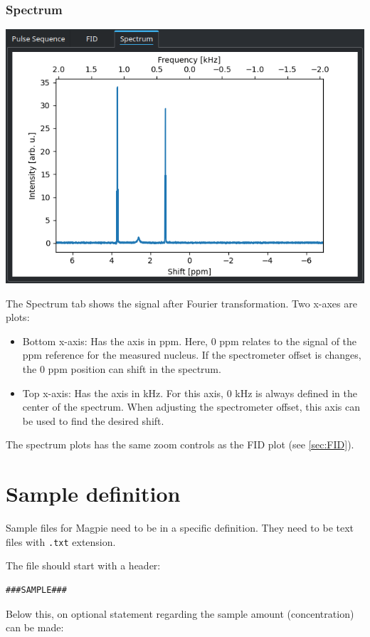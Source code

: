 \documentclass[11pt,a4paper]{article}
\begin{document}
\subsubsection{Spectrum}
\begin{center}
\includegraphics[width=0.9\linewidth]{images/Plot_Spectrum.png}
\end{center}
The Spectrum tab shows the signal after Fourier transformation. Two x-axes are plots:
\begin{itemize}
\item Bottom x-axis: Has the axis in ppm. Here, 0 ppm relates to the signal of the ppm reference for the measured nucleus. If the spectrometer offset is changes, the 0 ppm position can shift in the spectrum.
\item Top x-axis: Has the axis in kHz. For this axis, 0 kHz is always defined in the center of the spectrum. When adjusting the spectrometer offset, this axis can be used to find the desired shift.
\end{itemize}


The spectrum plots has the same zoom controls as the FID plot (see \autoref{sec:FID}).

\section{Sample definition}\label{sec:sample}
Sample files for Magpie need to be in a specific definition. They need to be text files with \texttt{.txt} extension.

The file should start with a header:
\begin{verbatim}
###SAMPLE###
\end{verbatim}
Below this, on optional statement regarding the sample amount (concentration) can be made:
\end{document}
